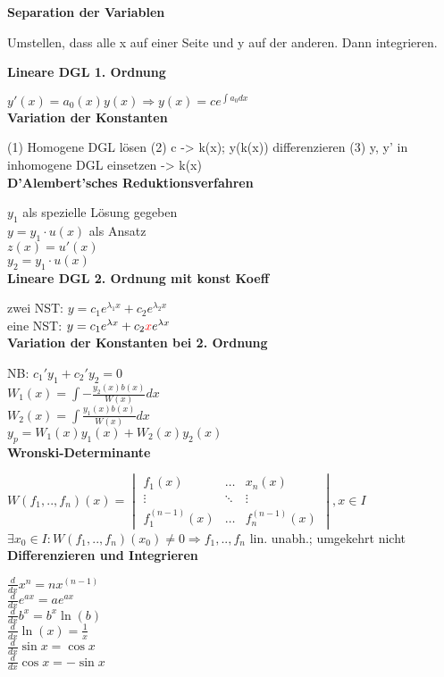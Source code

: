 \documentclass[10pt,twocolumn,a4paper]{article}
\begin{document}
\begin{flushleft}
\textbf{Separation der Variablen}

Umstellen, dass alle x auf einer Seite und y auf der anderen. Dann integrieren.

\textbf{Lineare DGL 1. Ordnung}

$y'(x)=a_0(x)y(x) \Rightarrow y(x) = ce^{\int{a_0}dx}$\\

\textbf{Variation der Konstanten}

(1) Homogene DGL lösen (2) c -> k(x); y(k(x)) differenzieren (3) y, y' in inhomogene DGL einsetzen -> k(x)\\

\textbf{D'Alembert'sches Reduktionsverfahren}

$y_1$ als spezielle Lösung gegeben\\
$y=y_1 \cdot u(x)$ als Ansatz\\
$z(x) = u'(x)$\\
$y_2 = y_1 \cdot u(x)$\\

\textbf{Lineare DGL 2. Ordnung mit konst Koeff}

zwei NST: $y = c_1 e^{\lambda_1 x} + c_2 e^{\lambda_2 x}$\\
eine NST: $y = c_1 e^{\lambda x} + c_2 \textcolor{red}{x} e^{\lambda x}$\\

\textbf{Variation der Konstanten bei 2. Ordnung}

NB: $c_1'y_1 + c_2'y_2 = 0$\\
$W_1(x) = \int - \frac{y_2(x)b(x)}{W(x)} dx$\\
$W_2(x) = \int \frac{y_1(x) b(x)}{W(x)} dx$\\
$y_p = W_1(x)y_1(x) + W_2(x)y_2(x)$\\

\textbf{Wronski-Determinante}

$ W(f_1,..,f_n)(x) =
\begin{vmatrix}
    f_{1}(x) & \dots  & x_{n}(x) \\
    \vdots & \ddots & \vdots \\
    f_{1}^{(n-1)}(x) & \dots & f_n^{(n-1)}(x)
\end{vmatrix}, x \in I
$\\
$\exists x_0 \in I: W(f_1,..,f_n)(x_0) \neq 0 \Rightarrow f_1,..,f_n$ lin. unabh.; umgekehrt nicht\\

\textbf{Differenzieren und Integrieren}

$\frac{d}{{dx}}x^n  = nx^{\left( {n - 1} \right)}$\\
$\frac{d}{{dx}}e^{ax}  = ae^{ax}$\\
$\frac{d}{{dx}}b^x  = b^x \ln \left( b \right)$\\
$\frac{d}{{dx}}\ln \left( x \right) = \frac{1}{x}$\\
$\frac{d}{{dx}}\sin x = \cos x$\\
$\frac{d}{{dx}}\cos x =  - \sin x$\\


\end{flushleft}
\end{document}
